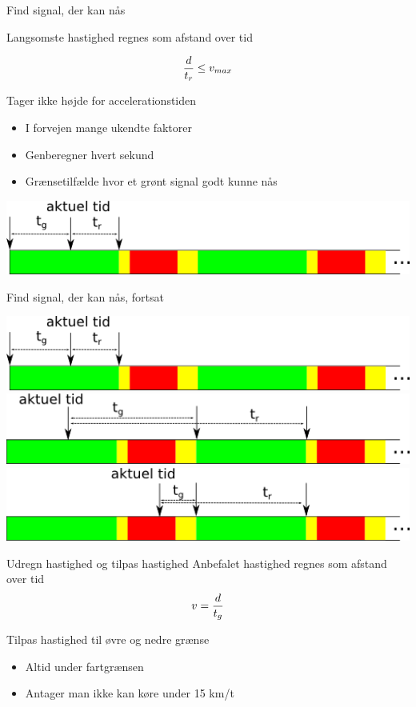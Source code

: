 \begin{frame}{Find signal, der kan nås}

Langsomste hastighed regnes som afstand over tid

\[\frac{d}{t_{r}}\leq v_{max}\]

Tager ikke højde for accelerationstiden
\begin{itemize}
\item I forvejen mange ukendte faktorer
\item Genberegner hvert sekund
\item Grænsetilfælde hvor et grønt signal godt kunne nås
\end{itemize}

\vspace{5mm}
\includegraphics[width=1\textwidth]{../images/algphases1.png}

\end{frame}

\begin{frame}{Find signal, der kan nås, fortsat}
\begin{center}
\includegraphics[width=1\textwidth]{../images/algphases1.png}
\vspace{5mm}
\includegraphics[width=1\textwidth]{../images/algphases2.png}
\vspace{5mm}
\includegraphics[width=1\textwidth]{../images/algphases3.png}
\end{center}
\end{frame}

\begin{frame}{Udregn hastighed og tilpas hastighed}
Anbefalet hastighed regnes som afstand over tid
\[v = \frac{d}{t_{g}}\]

Tilpas hastighed til øvre og nedre grænse
\begin{itemize}
\item Altid under fartgrænsen
\item Antager man ikke kan køre under 15 km/t
\end{itemize}

\end{frame}